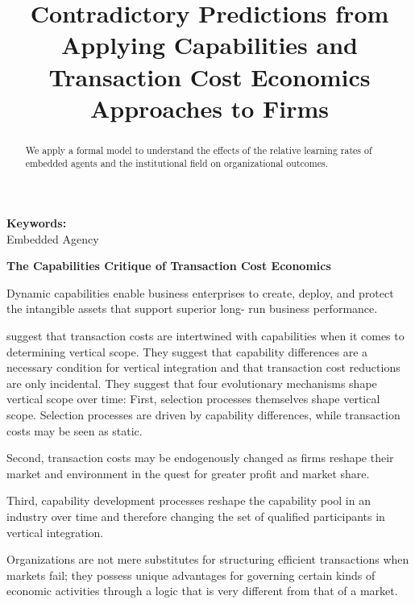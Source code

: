 \documentclass[12pt,letterpaper]{article}
\begin{document}
\title{Contradictory Predictions from Applying Capabilities and Transaction Cost Economics Approaches to Firms}
\date{}
\maketitle

\begin{abstract} 
\normalsize 
We apply a formal model to understand the effects of the relative learning rates of embedded agents and the institutional field on organizational outcomes. 
\end{abstract}


{\textbf{Keywords:} \\\indent Embedded Agency}

\newpage
\pagestyle{fancy}
\fancyhf{}
\rhead{\thepage}

\begin{center}
\textbf{The Capabilities Critique of Transaction Cost Economics}
\end{center}

\cite{Teece2007} Dynamic capabilities enable business enterprises to create, deploy, and protect the intangible assets that support superior long- run business performance.

\cite{Jacobides2005a} suggest that transaction costs are intertwined with capabilities when it comes to determining vertical scope. They suggest that capability differences are a necessary condition for vertical integration and that transaction cost reductions are only incidental. They suggest that four evolutionary mechanisms shape vertical scope over time:
First, selection processes themselves shape vertical scope. Selection processes are driven by capability differences, while transaction costs may be seen as static.

Second, transaction costs may be endogenously changed as firms reshape their market and environment in the quest for greater profit and market share. 

Third, capability development processes reshape the capability pool in an industry over time and therefore changing the set of qualified participants in vertical integration. 

\cite{Ghoshal1996} Organizations are not mere substitutes for structuring efficient transactions when markets fail; they possess unique advantages for governing certain kinds of economic activities through a logic that is very different from that of a market.
\end{document}
